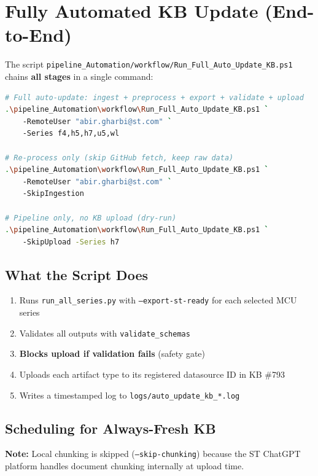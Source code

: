 \documentclass[12pt,a4paper]{report}
\begin{document}
\section{Fully Automated KB Update (End-to-End)}

The script \texttt{pipeline\_Automation/workflow/Run\_Full\_Auto\_Update\_KB.ps1} chains \textbf{all stages} in a single command:

\begin{lstlisting}[language=bash]
# Full auto-update: ingest + preprocess + export + validate + upload
.\pipeline_Automation\workflow\Run_Full_Auto_Update_KB.ps1 `
    -RemoteUser "abir.gharbi@st.com" `
    -Series f4,h5,h7,u5,wl

# Re-process only (skip GitHub fetch, keep raw data)
.\pipeline_Automation\workflow\Run_Full_Auto_Update_KB.ps1 `
    -RemoteUser "abir.gharbi@st.com" `
    -SkipIngestion

# Pipeline only, no KB upload (dry-run)
.\pipeline_Automation\workflow\Run_Full_Auto_Update_KB.ps1 `
    -SkipUpload -Series h7
\end{lstlisting}

\subsection{What the Script Does}

\begin{enumerate}
  \item Runs \texttt{run\_all\_series.py} with \texttt{--export-st-ready} for each selected MCU series
  \item Validates all outputs with \texttt{validate\_schemas}
  \item \textbf{Blocks upload if validation fails} (safety gate)
  \item Uploads each artifact type to its registered datasource ID in KB \#793
  \item Writes a timestamped log to \texttt{logs/auto\_update\_kb\_*.log}
\end{enumerate}

\subsection{Scheduling for Always-Fresh KB}

\textbf{Note:} Local chunking is skipped (\texttt{--skip-chunking}) because the ST ChatGPT platform handles document chunking internally at upload time.
\end{document}
